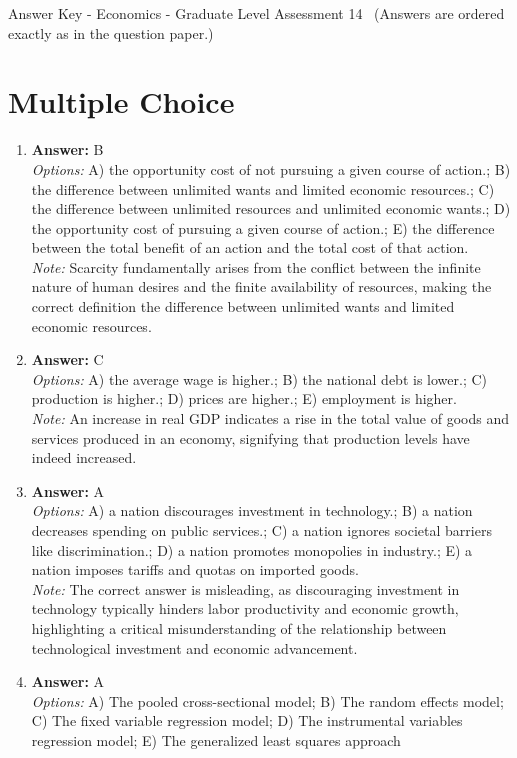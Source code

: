\documentclass[12pt]{article}
\begin{document}
\begin{center}
Answer Key - Economics - Graduate Level Assessment 14 \
\small (Answers are ordered exactly as in the question paper.)
\end{center}

\section*{Multiple Choice}
\begin{enumerate}[label=\arabic*.]
\item \textbf{Answer:} B
\\ \textit{Options:} A) the opportunity cost of not pursuing a given course of action.; B) the difference between unlimited wants and limited economic resources.; C) the difference between unlimited resources and unlimited economic wants.; D) the opportunity cost of pursuing a given course of action.; E) the difference between the total benefit of an action and the total cost of that action.
\\ \textit{Note:} Scarcity fundamentally arises from the conflict between the infinite nature of human desires and the finite availability of resources, making the correct definition the difference between unlimited wants and limited economic resources.
\item \textbf{Answer:} C
\\ \textit{Options:} A) the average wage is higher.; B) the national debt is lower.; C) production is higher.; D) prices are higher.; E) employment is higher.
\\ \textit{Note:} An increase in real GDP indicates a rise in the total value of goods and services produced in an economy, signifying that production levels have indeed increased.
\item \textbf{Answer:} A
\\ \textit{Options:} A) a nation discourages investment in technology.; B) a nation decreases spending on public services.; C) a nation ignores societal barriers like discrimination.; D) a nation promotes monopolies in industry.; E) a nation imposes tariffs and quotas on imported goods.
\\ \textit{Note:} The correct answer is misleading, as discouraging investment in technology typically hinders labor productivity and economic growth, highlighting a critical misunderstanding of the relationship between technological investment and economic advancement.
\item \textbf{Answer:} A
\\ \textit{Options:} A) The pooled cross-sectional model; B) The random effects model; C) The fixed variable regression model; D) The instrumental variables regression model; E) The generalized least squares approach

\end{enumerate}
\end{document}
